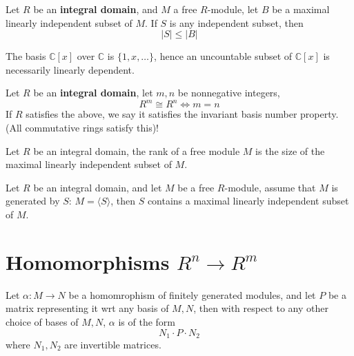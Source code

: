 \documentclass[openany]{book}
\newcommand{\C}{\mathbb{C}}
\newcommand{\la}{\langle}
\newcommand{\ra}{\rangle}
\begin{document}
\begin{prop}
    Let $R$ be an \textbf{integral domain}, and $M$ a free $R$-module, let $B$ be a maximal linearly independent subset of $M$. If $S$ is any independent subset, then 
    \begin{equation*}
        |S|\leq|B|
    \end{equation*}
\end{prop}
\begin{example}
    The basis $\C[x]$ over $\C$ is $\{1,x,\dots\}$, hence an uncountable subset of $\C[x]$ is necessarily linearly dependent.
\end{example}

\begin{prop}
    Let $R$ be an \textbf{integral domain}, let $m,n$ be nonnegative integers, 
    \begin{equation*}
        R^m \cong R^n\iff m=n
    \end{equation*}
    If $R$ satisfies the above, we say it satisfies the invariant basis number property. (All commutative rings satisfy this)!
\end{prop}

\begin{defn}
    Let $R$ be an integral domain, the rank of a free module $M$ is the size of the maximal linearly independent subset of $M$.
\end{defn}


\begin{prop}
    Let $R$ be an integral domain, and let $M$ be a free $R$-module, assume that $M$ is generated by $S$: $M=\la S\ra$, then $S$ contains a maximal linearly independent subset of $M$.
\end{prop}


\section{Homomorphisms $R^n\to R^m$}

\begin{prop}
    Let $\alpha:M\to N$ be a homomrophism of finitely generated modules, and let $P$ be a matrix representing it wrt any basis of $M,N$, then with respect to any other choice of bases of $M,N$, $\alpha$ is of the form
    \begin{equation*}
        N_1\cdot P\cdot N_2
    \end{equation*}
    where $N_1,N_2$ are invertible matrices.
\end{prop}
\end{document}
